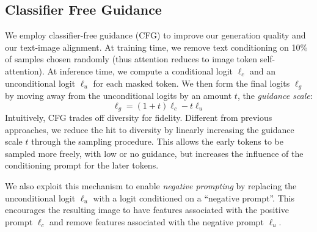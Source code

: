 \subsection{Classifier Free Guidance}
\label{sec:cfg}
We employ classifier-free guidance (CFG) \citep{ho2022classifier} to improve our generation quality and our text-image alignment. At training time, we remove text conditioning on 10\% of samples chosen randomly (thus attention reduces to image token self-attention). At inference time, we compute a conditional logit $\ell_c$ and an unconditional logit $\ell_u$ for each masked token. We then form the final logits $\ell_g$ by moving away from the unconditional logits by an amount $t$, the \emph{guidance scale}:
\begin{equation}
    \ell_g = (1+t)\ell_c - t \ell_u
    \label{eq:cfg}
\end{equation}
Intuitively, CFG trades off diversity for fidelity. Different from previous approaches, we reduce the hit to diversity by linearly increasing the guidance scale $t$ through the sampling procedure. This allows the early tokens to be sampled more freely, with low or no guidance, but increases the influence of the conditioning prompt for the later tokens.

We also exploit this mechanism to enable \emph{negative prompting} \citep{negprompt} by replacing the unconditional logit $\ell_u$ with a logit conditioned on a ``negative prompt''. This encourages the resulting image to have features associated with the positive prompt $\ell_c$ and remove features associated with the negative prompt $\ell_u$. 
